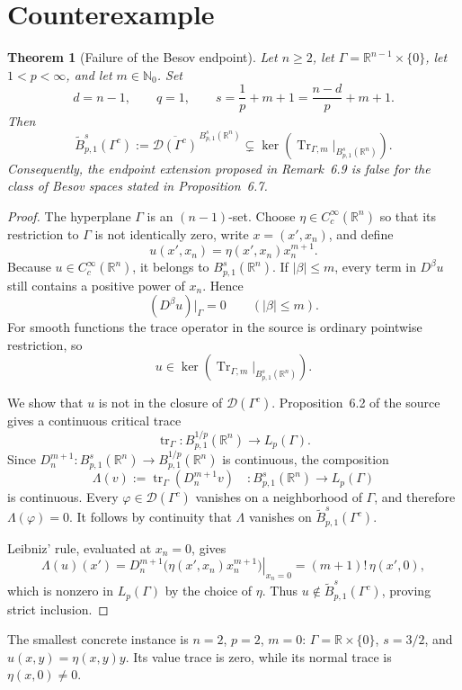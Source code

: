 \documentclass[11pt]{article}
\newtheorem{theorem}{Theorem}
\newcommand{\R}{\mathbb{R}}
\newcommand{\D}{\mathcal{D}}
\newcommand{\Tr}{\operatorname{Tr}}
\begin{document}
\section{Counterexample}

\begin{theorem}[Failure of the Besov endpoint]
Let $n\ge2$, let $\Gamma=\R^{n-1}\times\{0\}$, let $1<p<\infty$, and let
$m\in\mathbb N_0$.  Set
\[
 d=n-1,\qquad q=1,\qquad s=\frac1p+m+1
       =\frac{n-d}{p}+m+1.
\]
Then
\[
 \widetilde B^s_{p,1}(\Gamma^c)
 :=\overline{\D(\Gamma^c)}^{\,B^s_{p,1}(\R^n)}
 \subsetneq
 \ker\!\left(\Tr_{\Gamma,m}|_{B^s_{p,1}(\R^n)}\right).
\]
Consequently, the endpoint extension proposed in Remark~6.9 is false for
the class of Besov spaces stated in Proposition~6.7.
\end{theorem}

\begin{proof}
The hyperplane $\Gamma$ is an $(n-1)$-set.  Choose
$\eta\in C_c^\infty(\R^n)$ so that its restriction to $\Gamma$ is not
identically zero, write $x=(x',x_n)$, and define
\[
 u(x',x_n)=\eta(x',x_n)x_n^{m+1}.
\]
Because $u\in C_c^\infty(\R^n)$, it belongs to $B^s_{p,1}(\R^n)$.  If
$|\beta|\le m$, every term in $D^\beta u$ still contains a positive power of
$x_n$.  Hence
\[
 (D^\beta u)|_\Gamma=0\qquad (|\beta|\le m).
\]
For smooth functions the trace operator in the source is ordinary pointwise
restriction, so
\[
 u\in\ker\!\left(\Tr_{\Gamma,m}|_{B^s_{p,1}(\R^n)}\right).
\]

We show that $u$ is not in the closure of $\D(\Gamma^c)$.  Proposition~6.2
of the source gives a continuous critical trace
\[
 \operatorname{tr}_\Gamma:B^{1/p}_{p,1}(\R^n)\longrightarrow L_p(\Gamma).
\]
Since $D_n^{m+1}:B^s_{p,1}(\R^n)\to B^{1/p}_{p,1}(\R^n)$ is continuous, the
composition
\[
 \Lambda(v):=\operatorname{tr}_\Gamma(D_n^{m+1}v)
 \quad:B^s_{p,1}(\R^n)\longrightarrow L_p(\Gamma)
\]
is continuous.  Every $\varphi\in\D(\Gamma^c)$ vanishes on a neighborhood of
$\Gamma$, and therefore $\Lambda(\varphi)=0$.  It follows by continuity that
$\Lambda$ vanishes on $\widetilde B^s_{p,1}(\Gamma^c)$.

Leibniz' rule, evaluated at $x_n=0$, gives
\[
 \Lambda(u)(x')
 =\left.D_n^{m+1}\bigl(\eta(x',x_n)x_n^{m+1}\bigr)\right|_{x_n=0}
 =(m+1)!\,\eta(x',0),
\]
which is nonzero in $L_p(\Gamma)$ by the choice of $\eta$.  Thus
$u\notin\widetilde B^s_{p,1}(\Gamma^c)$, proving strict inclusion.
\end{proof}

The smallest concrete instance is $n=2$, $p=2$, $m=0$:
$\Gamma=\R\times\{0\}$, $s=3/2$, and $u(x,y)=\eta(x,y)y$.  Its value trace
is zero, while its normal trace is $\eta(x,0)\ne0$.
\end{document}
